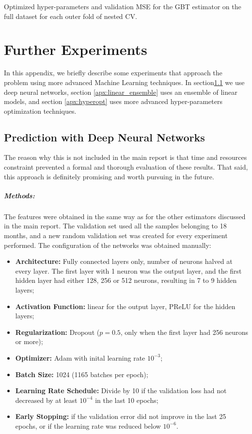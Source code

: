 \documentclass[a4paper,11pt]{kth-mag}
\begin{document}
\begin{table}
\caption{Optimized hyper-parameters and validation MSE for the GBT estimator on the full dataset for each outer fold of nested CV.}
\label{tbl:params_gbt_full}

\end{table}


\chapter{Further Experiments}
\label{apx:moar}
In this appendix, we briefly describe some experiments that approach the problem using more advanced Machine Learning techniques. In section\ref{apx:deep_learning} we use deep neural networks, section \ref{apx:linear_ensemble} uses an ensemble of linear models, and section \ref{apx:hyperopt} uses more advanced hyper-parameters optimization techniques.

\section{Prediction with Deep Neural Networks}
\label{apx:deep_learning}
The reason why this is not included in the main report is that time and resources constraint prevented a formal and thorough evaluation of these results. That said, this approach is definitely promising and worth pursuing in the future.

\paragraph{Methods:}
The features were obtained in the same way as for the other estimators discussed in the main report. The validation set used all the samples belonging to 18 months, and a new random validation set was created for every experiment performed. The configuration of the networks was obtained manually:

\begin{itemize}
\item \textbf{Architecture:} Fully connected layers only, number of neurons halved at every layer. The first layer with 1 neuron was the output layer, and the first hidden layer had either 128, 256 or 512 neurons, resulting in 7 to 9 hidden layers;
\item \textbf{Activation Function:} linear for the output layer, PReLU \citep{prelu} for the hidden layers;
\item \textbf{Regularization:} Dropout ($p=0.5$, only when the first layer had 256 neurons or more);
\item \textbf{Optimizer:} Adam \citep{adam} with inital learning rate $10^{-3}$;
\item \textbf{Batch Size:} 1024 (1165 batches per epoch);
\item \textbf{Learning Rate Schedule:} Divide by 10 if the validation loss had not decreased by at least $10^{-4}$ in the last 10 epochs;
\item \textbf{Early Stopping:} if the validation error did not improve in the last 25 epochs, or if the learning rate was reduced below $10^{-6}$.
\end{itemize}
\end{document}

